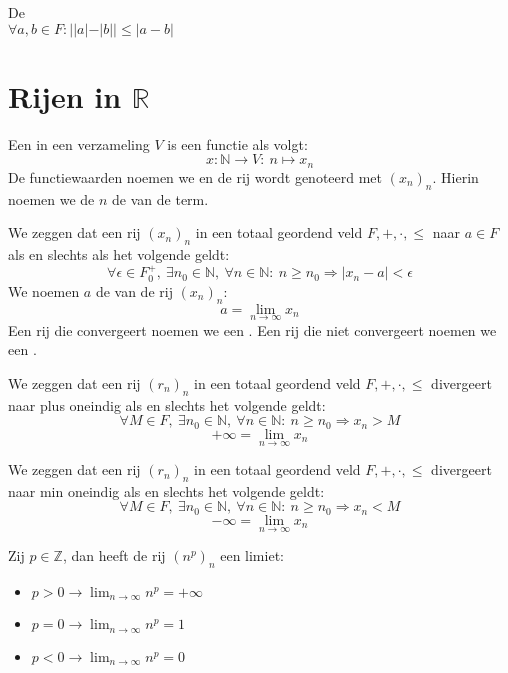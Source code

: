 \documentclass[main.tex]{subfiles}
\begin{document}
\begin{pr}
  De \\
  $\forall a,b\in F: ||a|-|b|| \le |a-b|$
\end{pr}

\section{Rijen in $\mathbb{R}$}
\label{sec:rijen-mathbbr}

\begin{de}
  Een  in een verzameling $V$ is een functie als volgt:
  \[ x: \mathbb{N} \rightarrow V:\ n\mapsto x_{n} \]
  De functiewaarden noemen we  en de rij wordt genoteerd met $(x_{n})_{n}$.
  Hierin noemen we de $n$ de  van de term.
\end{de}

\begin{de}
  We zeggen dat een rij $(x_{n})_{n}$ in een totaal geordend veld $F,+,\cdot,\le$  naar $a\in F$ als en slechts als het volgende geldt:
  \[ \forall \epsilon \in F_{0}^{+},\ \exists n_{0}\in \mathbb{N},\ \forall n\in \mathbb{N}:\ n \ge n_{0} \Rightarrow |x_{n}-a| < \epsilon \]
  We noemen $a$ de  van de rij $(x_{n})_{n}$:
  \[ a = \lim_{n\rightarrow \infty}x_{n} \]
  Een rij die convergeert noemen we een .
  Een rij die niet convergeert noemen we een .
\end{de}

\begin{de}
  We zeggen dat een rij $(r_{n})_{n}$ in een totaal geordend veld $F,+,\cdot,\le$ divergeert naar plus oneindig als en slechts het volgende geldt:
  \[ \forall M\in F,\ \exists n_{0}\in \mathbb{N},\ \forall n\in \mathbb{N}:\ n \ge n_{0} \Rightarrow x_{n} > M \]
  \[ + \infty = \lim_{n\rightarrow \infty}x_{n}\]
\end{de}

\begin{de}
  We zeggen dat een rij $(r_{n})_{n}$ in een totaal geordend veld $F,+,\cdot,\le$ divergeert naar min oneindig als en slechts het volgende geldt:
  \[ \forall M\in F,\ \exists n_{0}\in \mathbb{N},\ \forall n\in \mathbb{N}:\ n \ge n_{0} \Rightarrow x_{n} < M \]
  \[ - \infty = \lim_{n\rightarrow \infty}x_{n}\]
\end{de}


\begin{pr}
  Zij $p\in \mathbb{Z}$, dan heeft de rij $(n^{p})_{n}$ een limiet:
  \begin{itemize}
  \item $p>0 \rightarrow \lim_{n\rightarrow \infty}n^{p} = + \infty$
  \item $p=0 \rightarrow \lim_{n\rightarrow \infty}n^{p} = 1$
  \item $p<0 \rightarrow \lim_{n\rightarrow \infty}n^{p} = 0$
  \end{itemize}
\end{pr}
\end{document}
